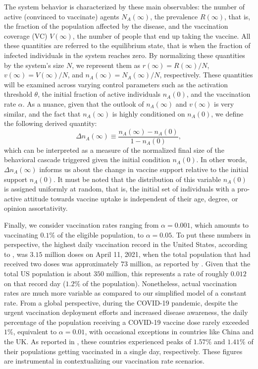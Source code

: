 \documentclass[
 reprint,
 amsmath,amssymb,
 aps,
]{revtex4-2}
\begin{document}
The system behavior is characterized by these main observables: the number of active (convinced to vaccinate) agents $N_A(\infty)$, the prevalence $R(\infty)$, that is, the fraction of the population affected by the disease, and the vaccination coverage (VC) $V(\infty)$, the number of people that end up taking the vaccine. All these quantities are referred to the equilibrium state, that is when the fraction of infected individuals in the system reaches zero. By normalizing these quantities by the system's size $N$, we represent them as $r(\infty)=R(\infty)/N$, $v(\infty)=V(\infty)/N$, and $n_A(\infty)=N_A(\infty)/N$, respectively. These quantities will be examined across varying control parameters such as the activation threshold $\theta$, the initial fraction of active individuals $n_A(0)$, and the vaccination rate $\alpha$. As a nuance, given that the outlook of $n_A(\infty)$ and $v(\infty)$ is very similar, and the fact that $n_A(\infty)$ is highly conditioned on $n_A(0)$, we define the following derived quantity:
\begin{equation}
    \Delta n_A(\infty)\equiv\frac{n_A(\infty)-n_A(0)}{1-n_A(0)},
\end{equation}
which can be interpreted as a measure of the normalized final size of the behavioral cascade triggered given the initial condition $n_A(0)$. In other words, $\Delta n_A(\infty)$ informs us about the change in vaccine support relative to the initial support $n_A(0)$. It must be noted that the distribution of this variable $n_A(0)$ is assigned uniformly at random, that is, the initial set of individuals with a pro-active attitude towards vaccine uptake is independent of their age, degree, or opinion assortativity. 

Finally, we consider vaccination rates ranging from $\alpha=0.001$, which amounts to vaccinating $0.1\%$ of the eligible population, to $\alpha=0.05$. To put these numbers in perspective, the highest daily vaccination record in the United States, according to \cite{owid_vaccine_rates}, was $3.15$ million doses on April 11, 2021, when the total population that had received two doses was approximately $73$ million, as reported by \cite{us_facts_vaccines}. Given that the total US population is about $350$ million, this represents a rate of roughly $0.012$ on that record day ($1.2\%$ of the population). Nonetheless, actual vaccination rates are much more variable as compared to our simplified model of a constant rate. From a global perspective, during the COVID-19 pandemic, despite the urgent vaccination deployment efforts and increased disease awareness, the daily percentage of the population receiving a COVID-19 vaccine dose rarely exceeded $1\%$, equivalent to $\alpha=0.01$, with occasional exceptions in countries like China and the UK.  As reported in \cite{owid_vaccine_rates2}, these countries experienced peaks of $1.57\%$ and $1.41\%$ of their populations getting vaccinated in a single day, respectively. These figures are instrumental in contextualizing our vaccination rate scenarios.
\end{document}
